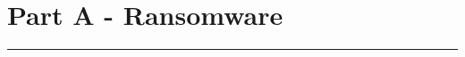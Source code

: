 \section*{Part A - Ransomware}

\noindent \begin{center}
\rule[0.5ex]{1\linewidth}{1pt}
\par\end{center}

\begin{comment}
    Ransomware has again come to the fore with the recent example of WannaCry in early May 2017. While
    what is did was not new, it managed to cause significant damage at a number of High profile organisations
    such as the UK NHS. Part of its 'success' is that it incorporated exploitation of the EternalBlue vulnerability
    within the SMB stack on Microsoft Windows platforms to spread, rather than they more traditional
    approach taken by ransomware operators of emailing out trojaned documents which contained the appropriate
    'dropper'. While it was initially expected that the many existing legacy installations of Windows
    XP and Windows Server 2003, both of which have been End of Life for some time were particularly hard
    hit. These systems were however not found to be the bulk of infections.
        a) How could organisations better prepare for future ransomware attacks. Bearing in mind that
        the UK NHS had been hit with other ransomware attacks in early 2017 [1,2,3]. Provide
        suitably motivated advice for a large organisation. (20)
        b) How would you adjust your advice for a smaller (<30 headcount) company? How do their
        risks differ from a large enterprise ? (10)
        c) In light of recent events, calls have been made for organisations to stockpile bitcoin as part of
        a DRP strategy [4,5,6]. Motivate for or against this opinion, providing suitable support for
        your argument. (15)
        d) One of the interesting observations with WannaCry is that it appears that relatively little
        money has changed hand in terms of ransom payments, with some organisations pitting this
        at around between 50K and 70K USD two weeks after launch [7]. This appears to have
        tailed off to around 150 000 USD [8,9]. Discuss this risk/reward tradeoff for an organisation
        running the WannaCry campaign. How does this compare to other data available on payments
        to ransomware operators. (15)
    
    The expected length 4-5 pages per question above, with Part A being 18-25 pages in total.
    

\end{comment}
